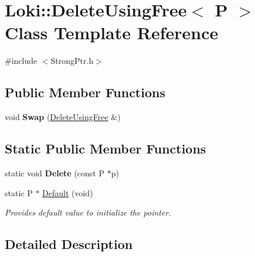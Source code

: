 \hypertarget{classLoki_1_1DeleteUsingFree}{}\section{Loki\+:\+:Delete\+Using\+Free$<$ P $>$ Class Template Reference}
\label{classLoki_1_1DeleteUsingFree}


{\ttfamily \#include $<$Strong\+Ptr.\+h$>$}

\subsection*{Public Member Functions}
\begin{DoxyCompactItemize}
\item 
\hypertarget{classLoki_1_1DeleteUsingFree_a26036e25b19f618ecc0cc38fa7e0277f}{}void {\bfseries Swap} (\hyperlink{classLoki_1_1DeleteUsingFree}{Delete\+Using\+Free} \&)\label{classLoki_1_1DeleteUsingFree_a26036e25b19f618ecc0cc38fa7e0277f}

\end{DoxyCompactItemize}
\subsection*{Static Public Member Functions}
\begin{DoxyCompactItemize}
\item 
\hypertarget{classLoki_1_1DeleteUsingFree_a5fffb60138b0d1635a2bfc30d7e49cef}{}static void {\bfseries Delete} (const P $\ast$p)\label{classLoki_1_1DeleteUsingFree_a5fffb60138b0d1635a2bfc30d7e49cef}

\item 
\hypertarget{classLoki_1_1DeleteUsingFree_a7b6ba686ce808a9c000067d7722dbd16}{}static P $\ast$ \hyperlink{classLoki_1_1DeleteUsingFree_a7b6ba686ce808a9c000067d7722dbd16}{Default} (void)\label{classLoki_1_1DeleteUsingFree_a7b6ba686ce808a9c000067d7722dbd16}

\begin{DoxyCompactList}\small\item\em Provides default value to initialize the pointer. \end{DoxyCompactList}\end{DoxyCompactItemize}


\subsection{Detailed Description}
